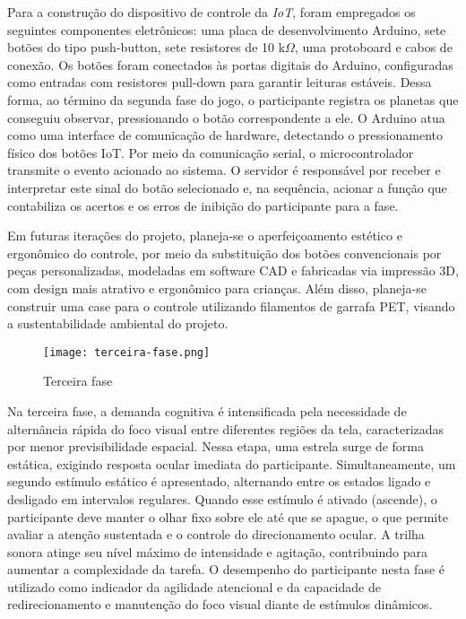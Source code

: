 Para a construção do dispositivo de controle da \textit{IoT}, foram empregados os seguintes componentes eletrônicos: uma placa de desenvolvimento Arduino, sete botões do tipo push-button, sete resistores de 10 k$\Omega$, uma protoboard e cabos de conexão. Os botões foram conectados às portas digitais do Arduino, configuradas como entradas com resistores pull-down para garantir leituras estáveis. Dessa forma, ao término da segunda fase do jogo, o participante registra os planetas que conseguiu observar, pressionando o botão correspondente a ele. O Arduino atua como uma interface de comunicação de hardware, detectando o pressionamento físico dos botões IoT. Por meio da comunicação serial, o microcontrolador transmite o evento acionado ao sistema. O servidor é responsável por receber e interpretar este sinal do botão selecionado e, na sequência, acionar a função que contabiliza os acertos e os erros de inibição do participante para a fase.

Em futuras iterações do projeto, planeja-se o aperfeiçoamento estético e ergonômico do controle, por meio da substituição dos botões convencionais por peças personalizadas, modeladas em software CAD e fabricadas via impressão 3D, com design mais atrativo e ergonômico para crianças. Além disso, planeja-se construir uma case para o controle utilizando filamentos de garrafa PET, visando a sustentabilidade ambiental do projeto.

\begin{figure}[H]
    \centering
    \caption{Terceira fase}%
    \label{fig:terceira-fase}
    \texttt{[image: terceira-fase.png]}%
\end{figure}

Na terceira fase, a demanda cognitiva é intensificada pela necessidade de alternância rápida do foco visual entre diferentes regiões da tela, caracterizadas por menor previsibilidade espacial. Nessa etapa, uma estrela surge de forma estática, exigindo resposta ocular imediata do participante. Simultaneamente, um segundo estímulo estático é apresentado, alternando entre os estados ligado e desligado em intervalos regulares. Quando esse estímulo é ativado (ascende), o participante deve manter o olhar fixo sobre ele até que se apague, o que permite avaliar a atenção sustentada e o controle do direcionamento ocular. A trilha sonora atinge seu nível máximo de intensidade e agitação, contribuindo para aumentar a complexidade da tarefa. O desempenho do participante nesta fase é utilizado como indicador da agilidade atencional e da capacidade de redirecionamento e manutenção do foco visual diante de estímulos dinâmicos.

